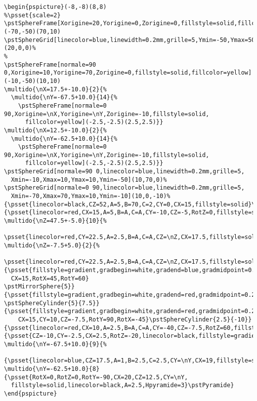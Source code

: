 \documentclass[11pt,frenchb,BCOR10mm,DIV12,bibliography=totoc,parskip=false,smallheadings
    headexclude,footexclude,oneside]{pst-doc}
\begin{document}
\begin{lstlisting}
\begin{pspicture}(-8,-8)(8,8)
%\psset{scale=2}
\pstSphereFrame[Xorigine=20,Yorigine=0,Zorigine=0,fillstyle=solid,fillcolor=OrangePale](-70,-50)(70,10)
\pstSphereGrid[linecolor=blue,linewidth=0.2mm,grille=5,Ymin=-50,Ymax=50,Xmax=70,Xmin=-70](20,0,0)%
%
\pstSphereFrame[normale=90 0,Xorigine=10,Yorigine=70,Zorigine=0,fillstyle=solid,fillcolor=yellow](-10,-50)(10,10)
\multido{\nX=17.5+-10.0}{2}{%
  \multido{\nY=-67.5+10.0}{14}{%
    \pstSphereFrame[normale=0 90,Xorigine=\nX,Yorigine=\nY,Zorigine=-10,fillstyle=solid,
      fillcolor=yellow](-2.5,-2.5)(2.5,2.5)}}
\multido{\nX=12.5+-10.0}{2}{%
  \multido{\nY=-62.5+10.0}{14}{%
    \pstSphereFrame[normale=0 90,Xorigine=\nX,Yorigine=\nY,Zorigine=-10,fillstyle=solid,
      fillcolor=yellow](-2.5,-2.5)(2.5,2.5)}}
\pstSphereGrid[normale=90 0,linecolor=blue,linewidth=0.2mm,grille=5,
  Xmin=-10,Xmax=10,Ymax=10,Ymin=-50](10,70,0)%
\pstSphereGrid[normale=0 90,linecolor=blue,linewidth=0.2mm,grille=5,
  Xmin=-70,Xmax=70,Ymax=10,Ymin=-10](10,0,-10)%
{\psset{linecolor=black,CZ=52,A=5,B=70,C=2,CY=0,CX=15,fillstyle=solid}\pstCube}
{\psset{linecolor=red,CX=15,A=5,B=A,C=A,CY=-10,CZ=-5,RotZ=0,fillstyle=solid,fillcolor=blue}\pstDie}%
\multido{\nZ=47.5+-5.0}{10}{%
  \psset{linecolor=red,CY=22.5,A=2.5,B=A,C=A,CZ=\nZ,CX=17.5,fillstyle=solid}\pstCube}
\multido{\nZ=-7.5+5.0}{2}{%
  \psset{linecolor=red,CY=22.5,A=2.5,B=A,C=A,CZ=\nZ,CX=17.5,fillstyle=solid}\pstCube}
{\psset{fillstyle=gradient,gradbegin=white,gradend=blue,gradmidpoint=0.2,linecolor=cyan,linewidth=0.1mm,%
  CX=15,RotX=45,RotY=60}
\pstMirrorSphere{5}}
{\psset{fillstyle=gradient,gradbegin=white,gradend=red,gradmidpoint=0.2,linewidth=0.1mm,CX=10,CY=20,CZ=-10}
\pstSphereCylinder{5}{7.5}}
{\psset{fillstyle=gradient,gradbegin=white,gradend=red,gradmidpoint=0.2,linewidth=0.1mm,%
    CX=15,CY=10,CZ=-7.5,RotY=90,RotX=-45}\pstSphereCylinder{2.5}{-10}}
{\psset{linecolor=red,CX=10,A=2.5,B=A,C=A,CY=-40,CZ=-7.5,RotZ=60,fillstyle=solid,fillcolor=yellow}\pstDie}%
{\psset{CZ=-10,CY=-2.5,CX=2.5,RotZ=-20,linecolor=black,fillstyle=gradient,Rtetraedre=2.5}\pstTetraedre}
\multido{\nY=-67.5+10.0}{9}{%
  {\psset{linecolor=blue,CZ=17.5,A=1,B=2.5,C=2.5,CY=\nY,CX=19,fillstyle=solid,linewidth=0.1mm}\pstCube}}
\multido{\nY=-62.5+10.0}{8}{\psset{RotX=0,RotZ=0,RotY=-90,CX=20,CZ=12.5,CY=\nY,
  fillstyle=solid,linecolor=black,A=2.5,Hpyramide=3}\pstPyramide}
\end{pspicture}
\end{lstlisting}
\end{document}
